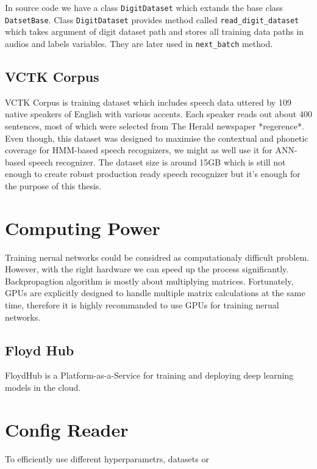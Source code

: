 In source code we have a class \texttt{DigitDataset} which extands the base class \texttt{DatsetBase}.
Class \texttt{DigitDataset} provides method called \texttt{read\_digit\_dataset} which takes argument of digit dataset path and stores all training data paths in audios and labels variables.
They are later used in \texttt{next\_batch} method.

\subsection{VCTK Corpus}

VCTK Corpus is training dataset which includes speech data uttered by 109 native speakers of English with various accents.
Each speaker reads out about 400 sentences, most of which were selected from The Herald newspaper *regerence*.
Even though, this dataset was designed to maximise the contextual and phonetic coverage for HMM-based speech recognizers, we might as well use it for ANN-based speech recognizer.
The dataset size is around 15GB which is still not enough to create robust production ready speech recognizer but it's enough for the purpose of this thesis.


\section{Computing Power}

Training nerual networks could be considred as computationaly difficult problem.
However, with the right hardware we can speed up the process significantly.
Backpropagtion algorithm is mostly about multiplying matrices.
Fortunately, GPUs are explicitly designed to handle multiple matrix calculations at the same time, therefore it is highly recommanded to use GPUs for training nerual networks.

\subsection{Floyd Hub}

FloydHub is a Platform-as-a-Service for training and deploying deep learning models in the cloud.


\section{Config Reader}

To efficiently use different hyperparametrs, datasets or


